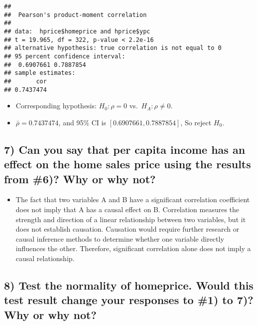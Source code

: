 \documentclass[
  12pt,
]{article}
\providecommand{\tightlist}{%
  \setlength{\itemsep}{0pt}\setlength{\parskip}{0pt}}
\begin{document}
\begin{verbatim}
## 
##  Pearson's product-moment correlation
## 
## data:  hprice$homeprice and hprice$ypc
## t = 19.965, df = 322, p-value < 2.2e-16
## alternative hypothesis: true correlation is not equal to 0
## 95 percent confidence interval:
##  0.6907661 0.7887854
## sample estimates:
##       cor 
## 0.7437474
\end{verbatim}

\begin{itemize}
\tightlist
\item
  Corresponding hypothesis: \(H_0:\rho=0\) vs.~\(H_A:\rho\neq0\).
\item
  \(\bar\rho=0.7437474\), and 95\% CI is \([0.6907661,0.7887854]\), So
  reject \(H_0\).
\end{itemize}

\hypertarget{can-you-say-that-per-capita-income-has-an-effect-on-the-home-sales-price-using-the-results-from-6-why-or-why-not}{%
\subsection{7) Can you say that per capita income has an effect on the
home sales price using the results from \#6)? Why or why
not?}\label{can-you-say-that-per-capita-income-has-an-effect-on-the-home-sales-price-using-the-results-from-6-why-or-why-not}}

\begin{itemize}
\tightlist
\item
  The fact that two variables A and B have a significant correlation
  coefficient does not imply that A has a causal effect on B.
  Correlation measures the strength and direction of a linear
  relationship between two variables, but it does not establish
  causation. Causation would require further research or causal
  inference methods to determine whether one variable directly
  influences the other. Therefore, significant correlation alone does
  not imply a causal relationship.
\end{itemize}

\hypertarget{test-the-normality-of-homeprice.-would-this-test-result-change-your-responses-to-1-to-7-why-or-why-not}{%
\subsection{8) Test the normality of homeprice. Would this test result
change your responses to \#1) to 7)? Why or why
not?}\label{test-the-normality-of-homeprice.-would-this-test-result-change-your-responses-to-1-to-7-why-or-why-not}}
\end{document}
